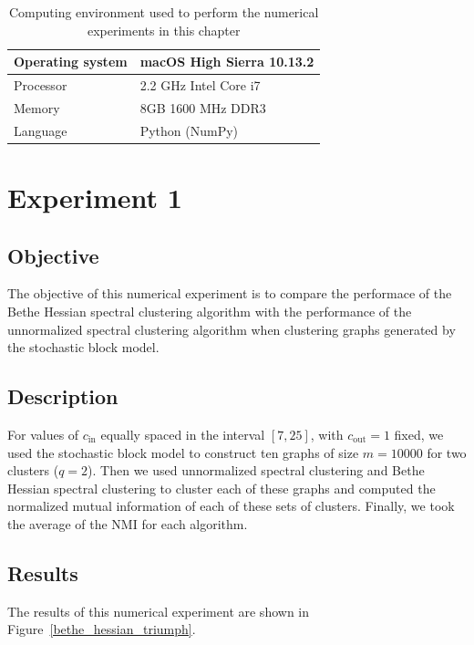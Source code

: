 \begin{table}[h]
\centering
\caption{Computing environment used to perform the numerical experiments in this chapter}
\label{environment}
\begin{tabular}{l|l}
\hline
Operating system & macOS High Sierra 10.13.2 \\ \hline
Processor        & 2.2 GHz Intel Core i7     \\ \hline
Memory           & 8GB 1600 MHz DDR3         \\ \hline
Language         & Python (NumPy)            \\ \hline
\end{tabular}
\end{table}

\section{Experiment 1}
\subsection*{Objective}
The objective of this numerical experiment is to compare the performace of the Bethe Hessian spectral clustering algorithm with the performance of the unnormalized spectral clustering algorithm when clustering graphs generated by the stochastic block model.
\subsection*{Description}
For values of $c_\text{in}$ equally spaced in the interval $[7,25]$, with $c_\text{out} = 1$ fixed, we used the stochastic block model to construct ten graphs of size $m = 10000$ for two clusters ($q = 2$).
Then we used unnormalized spectral clustering and Bethe Hessian spectral clustering to cluster each of these graphs and computed the normalized mutual information of each of these sets of clusters.
Finally, we took the average of the NMI for each algorithm.

\subsection*{Results}
The results of this numerical experiment are shown in Figure~\vref{bethe_hessian_triumph}.

